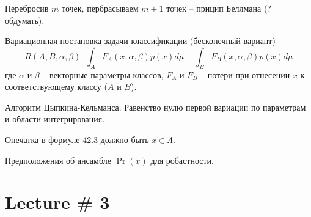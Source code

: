 \documentclass[a4paper]{article}
\newcommand{\defn}{\mathop{\overset{\Delta}{=}}\nolimits}
\begin{document}
Перебросив $m$ точек, пербрасываем $m+1$ точек -- прицип Беллмана (? обдумать).


Вариационная постановка задачи классификации (бесконечный вариант)
\[R(A,B,\alpha,\beta)\defn \int_A F_A(x,\alpha,\beta) p(x) d\mu + \int_B F_B(x,\alpha,\beta) p(x) d\mu\]
где $\alpha$ и $\beta$ -- векторные параметры классов, $F_A$ и $F_B$ -- потери при отнесении $x$ к соответствующему классу ($A$ и $B$).

Алгоритм Цыпкина-Кельманса.
Равенство нулю первой вариации по параметрам и области интегрирования.

Опечатка в формуле 42.3 должно быть $x\in \Lambda$.

Предположения об ансамбле $\Pr(x)$ для робастности.






\section{Lecture \# 3} %
\label{sec:lecture_3}



\end{document}
